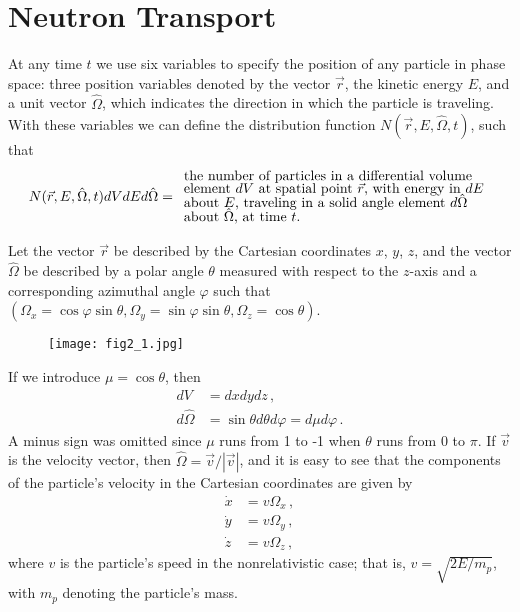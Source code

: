 \documentclass[12pt]{article}
\newcommand{\rvec}{\ensuremath{\vec{r}}}
\newcommand{\omvec}{\ensuremath{\hat{\Omega}}}
\begin{document}
\section*{Neutron Transport}

At any time $t$ we use six variables to specify the
position of any particle in phase space: three position variables denoted by the vector $\rvec$,
the kinetic energy $E$, and a unit vector $\omvec$, which indicates the direction in which the
particle is traveling. With these variables we can define the distribution function
$N(\rvec,E,\omvec,t)$,
such that
\begin{align*}
N(\rvec,E,\omvec,t)dVdEd\omvec = \begin{array}{l}
\text{the number of particles in a differential volume}\vspace{-0.1 cm}\\
\text{element $dV$ at spatial point $\rvec$, with energy in $dE$}\vspace{-0.1 cm}\\
\text{about $E$, traveling in a solid angle element $d\omvec$}\vspace{-0.1 cm}\\
\text{about $\omvec$, at time $t$.}
\end{array}\label{nmbpart}
\end{align*} 

 Let the vector $\rvec$ be described by the Cartesian coordinates $x$, $y$, $z$, and the vector
$\omvec$ be described by a polar angle $\theta$ measured with respect to the $z$-axis
 and a corresponding azimuthal angle $\varphi$ such that $(\Omega_x=\cos\varphi \sin\theta, \Omega_y = \sin\varphi \sin\theta, \Omega_z = \cos\theta)$.
\begin{figure}%
\texttt{[image: fig2\_1.jpg]}
\end{figure}
 If we introduce $\mu = \cos\theta$, then
\begin{align*}
dV &= dxdydz\,,
\\
d\omvec &=  \sin\theta d\theta d\varphi = d\mu d\varphi\,. 
\end{align*}
A minus sign was omitted since $\mu$ runs from
1 to -1 when $\theta$ runs from 0 to $\pi$.
If $\vec{v}$ is the velocity vector, then $\omvec = \vec{v}/{|\vec{v}|}$,
and
it is easy to see that the components of the particle's velocity in the Cartesian
coordinates are given by
\begin{align*}
\dot x &=  v\Omega_x\,,\\
\dot y &=  v\Omega_y\,,\\
\dot z &=  v\Omega_z\,,
\end{align*}
 where $v$ is the particle's speed in the nonrelativistic case; that is, $v = \sqrt{2E/m_p}$, with $m_p$
denoting the particle's mass.
\end{document}
